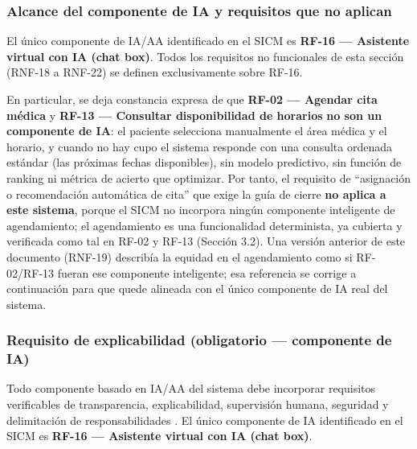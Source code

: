 \documentclass[11pt,a4paper]{article}
\begin{document}
	\subsubsection{ Alcance del componente de IA y requisitos que no aplican}
	
	El único componente de IA/AA identificado en el SICM es \textbf{RF-16 --- Asistente virtual con IA (chat box)}. Todos los requisitos no funcionales de esta sección (RNF-18 a RNF-22) se definen exclusivamente sobre RF-16.
	
	En particular, se deja constancia expresa de que \textbf{RF-02 --- Agendar cita médica} y \textbf{RF-13 --- Consultar disponibilidad de horarios} \textbf{no son un componente de IA}: el paciente selecciona manualmente el área médica y el horario, y cuando no hay cupo el sistema responde con una consulta ordenada estándar (las próximas fechas disponibles), sin modelo predictivo, sin función de ranking ni métrica de acierto que optimizar. Por tanto, el requisito de ``asignación o recomendación automática de cita'' que exige la guía de cierre \textbf{no aplica a este sistema}, porque el SICM no incorpora ningún componente inteligente de agendamiento; el agendamiento es una funcionalidad determinista, ya cubierta y verificada como tal en RF-02 y RF-13 (Sección 3.2). Una versión anterior de este documento (RNF-19) describía la equidad en el agendamiento como si RF-02/RF-13 fueran ese componente inteligente; esa referencia se corrige a continuación para que quede alineada con el único componente de IA real del sistema.
	
	\subsubsection{ Requisito de explicabilidad (obligatorio --- componente de IA)}
	
	Todo componente basado en IA/AA del sistema debe incorporar requisitos verificables de transparencia, explicabilidad, supervisión humana, seguridad y delimitación de responsabilidades \cite{whoai2021,euaiact2024,fda2022,habiba2024}. El único componente de IA identificado en el SICM es \textbf{RF-16 --- Asistente virtual con IA (chat box)}.
	
\end{document}

